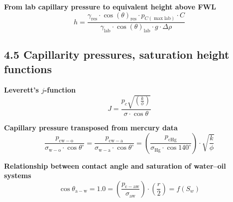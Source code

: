 \textbf{From lab capillary pressure to equivalent height above FWL}
\begin{equation*}
    h = \frac{\gamma_\mathrm{res}\cdot\cos(\theta)_\mathrm{res}\cdot p_{C(\max \mathrm{lab})}\cdot C}{\gamma_\mathrm{lab}\cdot\cos(\theta)_\mathrm{lab}\cdot g\cdot\Delta\rho}\tag{4.37}
\end{equation*}

\subsection{4.5 Capillarity pressures, saturation height functions}
\textbf{Leverett's $j$-function}
\begin{equation*}
    J = \frac{p_c\sqrt{\left( \frac{k}{\phi} \right)}}{\sigma\cdot\cos\theta}\tag{4.38}
\end{equation*}

\textbf{Capillary pressure transposed from mercury data}
\begin{equation*}
    \frac{p_{\mathrm{cw-o}}}{\sigma_\mathrm{w-o}\cdot\cos\theta^\circ} = \frac{p_{\mathrm{cw-a}}}{\sigma_\mathrm{w-a}\cdot\cos\theta^\circ} = \left(\frac{p_{\mathrm{cHg}}}{\sigma_\mathrm{Hg}\cdot\cos140^\circ}\right)\cdot\sqrt{\frac{k}{\phi}}\tag{4.39}
\end{equation*}

\textbf{Relationship between contact angle and saturation of water--oil systems}
\begin{equation*}
    \cos\theta_\mathrm{a-w} = 1.0 = \left( \frac{p_\mathrm{c-aw}}{\sigma_\mathrm{aw}} \right)\cdot\left( \frac{r}{2} \right) = f(S_w)\tag{4.40}
\end{equation*}

